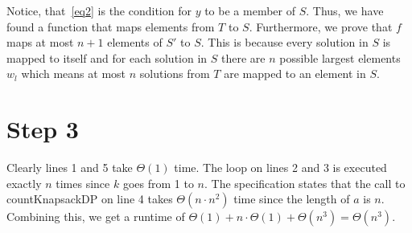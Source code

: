 \documentclass[a4paper]{article}
\begin{document}
Notice, that~\eqref{eq2} is the condition for $y$ to be a member of $S$. Thus, we have found a function that maps elements from $T$ to $S$. Furthermore, we prove that $f$ maps at most $n + 1$ elements of $S'$ to $S$.
This is because every solution in $S$ is mapped to itself and for each solution in $S$ there are $n$ possible largest elements $w_l$ which means at most $n$ solutions from $T$ are mapped to an element in $S$.

\section*{Step 3}
Clearly lines 1 and 5 take $\Theta(1)$ time. The loop on lines 2 and 3 is executed exactly $n$ times since $k$ goes from 1 to $n$.
The specification states that the call to countKnapsackDP on line 4 takes $\Theta(n \cdot n^2)$ time since the length of $a$ is $n$.
Combining this, we get a runtime of $\Theta(1) + n \cdot \Theta(1) + \Theta(n^3) = \Theta(n^3)$.
\end{document}
